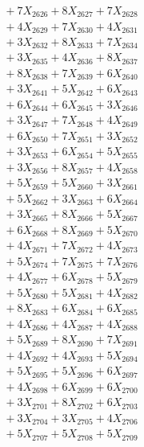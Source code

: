 \documentclass[a4paper,10pt]{article}
\begin{document}
{\begin{align}
&\;  + 7 X_{2626} + 8 X_{2627} + 7 X_{2628} \\[0.3ex]
&\;  + 4 X_{2629} + 7 X_{2630} + 4 X_{2631} \\[0.3ex]
&\;  + 3 X_{2632} + 8 X_{2633} + 7 X_{2634} \\[0.3ex]
&\;  + 3 X_{2635} + 4 X_{2636} + 8 X_{2637} \\[0.3ex]
&\;  + 8 X_{2638} + 7 X_{2639} + 6 X_{2640} \\[0.3ex]
&\;  + 3 X_{2641} + 5 X_{2642} + 6 X_{2643} \\[0.3ex]
&\;  + 6 X_{2644} + 6 X_{2645} + 3 X_{2646} \\[0.3ex]
&\;  + 3 X_{2647} + 7 X_{2648} + 4 X_{2649} \\[0.5ex]\allowbreak
&\;  + 6 X_{2650} + 7 X_{2651} + 3 X_{2652} \\[0.3ex]
&\;  + 3 X_{2653} + 6 X_{2654} + 5 X_{2655} \\[0.3ex]
&\;  + 3 X_{2656} + 8 X_{2657} + 4 X_{2658} \\[0.3ex]
&\;  + 5 X_{2659} + 5 X_{2660} + 3 X_{2661} \\[0.3ex]
&\;  + 5 X_{2662} + 3 X_{2663} + 6 X_{2664} \\[0.3ex]
&\;  + 3 X_{2665} + 8 X_{2666} + 5 X_{2667} \\[0.3ex]
&\;  + 6 X_{2668} + 8 X_{2669} + 5 X_{2670} \\[0.3ex]
&\;  + 4 X_{2671} + 7 X_{2672} + 4 X_{2673} \\[0.3ex]
&\;  + 5 X_{2674} + 7 X_{2675} + 7 X_{2676} \\[0.3ex]
&\;  + 4 X_{2677} + 6 X_{2678} + 5 X_{2679} \\[0.5ex]\allowbreak
&\;  + 5 X_{2680} + 5 X_{2681} + 4 X_{2682} \\[0.3ex]
&\;  + 8 X_{2683} + 6 X_{2684} + 6 X_{2685} \\[0.3ex]
&\;  + 4 X_{2686} + 4 X_{2687} + 4 X_{2688} \\[0.3ex]
&\;  + 5 X_{2689} + 8 X_{2690} + 7 X_{2691} \\[0.3ex]
&\;  + 4 X_{2692} + 4 X_{2693} + 5 X_{2694} \\[0.3ex]
&\;  + 5 X_{2695} + 5 X_{2696} + 6 X_{2697} \\[0.3ex]
&\;  + 4 X_{2698} + 6 X_{2699} + 6 X_{2700} \\[0.3ex]
&\;  + 3 X_{2701} + 8 X_{2702} + 6 X_{2703} \\[0.3ex]
&\;  + 3 X_{2704} + 3 X_{2705} + 4 X_{2706} \\[0.3ex]
&\;  + 5 X_{2707} + 5 X_{2708} + 5 X_{2709} \\[0.5ex]\allowbreak

\end{align}}
\end{document}
